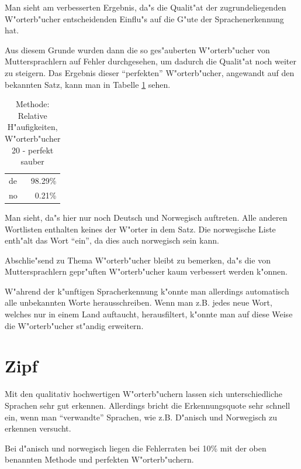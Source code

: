 Man sieht am verbesserten Ergebnis, da"s die Qualit"at der zugrundeliegenden W"orterb"ucher entscheidenden Einflu"s auf die G"ute der Sprachenerkennung hat.

Aus diesem Grunde wurden dann die so ges"auberten W"orterb"ucher von Muttersprachlern auf Fehler durchgesehen, um dadurch die Qualit"at noch weiter zu steigern. Das Ergebnis dieser "`perfekten"' W"orterb"ucher, angewandt auf den bekannten Satz, kann man in Tabelle \ref{dritteSpracherkennung} sehen.

\pagebreak 

\begin{table}[t]
\begin{center}
\begin{tabular}{|l|r|}
\hline
de  &98.29\% \\
no  &0.21\% \\
\hline
\end{tabular}
\end{center}
\caption{Methode: Relative H"aufigkeiten, W"orterb"ucher 20 - perfekt sauber}
\label{dritteSpracherkennung}
\end{table}

Man sieht, da"s hier nur noch Deutsch und Norwegisch auftreten. Alle anderen Wortlisten enthalten keines der W"orter in dem Satz. Die norwegische Liste enth"alt das Wort "`ein"', da dies auch norwegisch sein kann.

Abschlie"send zu Thema W"orterb"ucher bleibt zu bemerken, da"s die von Muttersprachlern gepr"uften W"orterb"ucher kaum verbessert werden k"onnen. 

W"ahrend der k"unftigen Spracherkennung k"onnte man allerdings automatisch alle unbekannten Worte herausschreiben. Wenn man z.B. jedes neue Wort, welches nur in einem Land auftaucht, herausfiltert, k"onnte man auf diese Weise die W"orterb"ucher st"andig erweitern.



\section{Zipf}

Mit den qualitativ hochwertigen W"orterb"uchern lassen sich unterschiedliche Sprachen sehr gut erkennen. Allerdings bricht die Erkennungsquote sehr schnell ein, wenn man "`verwandte"' Sprachen, wie z.B. D"anisch und Norwegisch zu  erkennen versucht.

Bei d"anisch und norwegisch liegen die Fehlerraten bei 10\% mit der oben benannten Methode und perfekten W"orterb"uchern.

